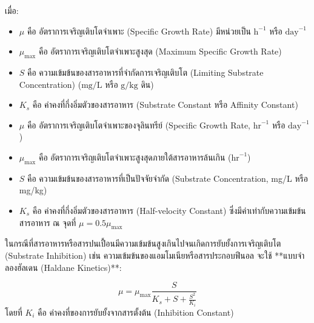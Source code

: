 เมื่อ:
\begin{itemize}
    \item $\mu$ คือ อัตราการเจริญเติบโตจำเพาะ (Specific Growth Rate) มีหน่วยเป็น $\text{h}^{-1}$ หรือ $\text{day}^{-1}$
    \item $\mu_{\max}$ คือ อัตราการเจริญเติบโตจำเพาะสูงสุด (Maximum Specific Growth Rate)
    \item $S$ คือ ความเข้มข้นของสารอาหารที่จำกัดการเจริญเติบโต (Limiting Substrate Concentration) ($\text{mg/L}$ หรือ $\text{g/kg}$ ดิน)
    \item $K_s$ คือ ค่าคงที่กึ่งอิ่มตัวของสารอาหาร (Substrate Constant หรือ Affinity Constant)
\end{itemize}
\begin{itemize}
    \item $\mu$ คือ อัตราการเจริญเติบโตจำเพาะของจุลินทรีย์ (Specific Growth Rate, $\text{hr}^{-1}$ หรือ $\text{day}^{-1}$)
    \item $\mu_{\max}$ คือ อัตราการเจริญเติบโตจำเพาะสูงสุดภายใต้สารอาหารล้นเกิน ($\text{hr}^{-1}$)
    \item $S$ คือ ความเข้มข้นของสารอาหารที่เป็นปัจจัยจำกัด (Substrate Concentration, mg/L หรือ mg/kg)
    \item $K_s$ คือ ค่าคงที่กึ่งอิ่มตัวของสารอาหาร (Half-velocity Constant) ซึ่งมีค่าเท่ากับความเข้มข้นสารอาหาร ณ จุดที่ $\mu = 0.5 \mu_{\max}$
\end{itemize}

ในกรณีที่สารอาหารหรือสารปนเปื้อนมีความเข้มข้นสูงเกินไปจนเกิดการยับยั้งการเจริญเติบโต (Substrate Inhibition) เช่น ความเข้มข้นของแอมโมเนียหรือสารประกอบฟีนอล จะใช้ **แบบจำลองฮัลเดน (Haldane Kinetics)**:

\begin{equation}
\mu = \mu_{\max} \frac{S}{K_s + S + \frac{S^2}{K_i}}
\label{eq:haldane}
\end{equation}
โดยที่ $K_i$ คือ ค่าคงที่ของการยับยั้งจากสารตั้งต้น (Inhibition Constant)


